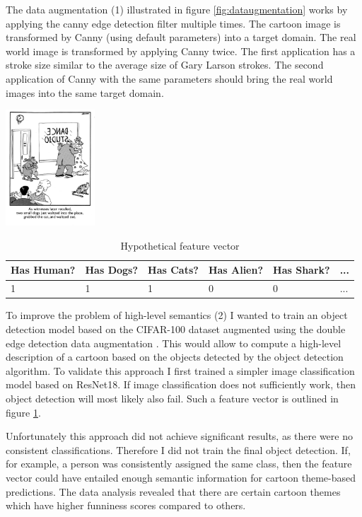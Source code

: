 \documentclass[draft,final,oneside]{vutinfth} %
\begin{document}
The data augmentation (1) illustrated in figure \ref{fig:dataugmentation} works by applying the canny edge detection filter multiple times. The cartoon image is transformed by Canny (using default parameters) into a target domain. The real world image is transformed by applying Canny twice. The first application has a stroke size similar to the average size of Gary Larson strokes. The second application of Canny with the same parameters should bring the real world images into the same target domain.

\begin{table}[]
\centering
\includegraphics[width=0.25\textwidth]{graphics/example_cartoon.png}
\begin{tabular}{|l|l|l|l|l|l|}
\hline
Has Human? & Has Dogs? & Has Cats? & Has Alien? & Has Shark? & ... \\ \hline
1   & 1 & 1 & 0 & 0 & ... \\
\hline
\end{tabular}
\caption{Hypothetical feature vector}
\label{objectdetectionfeaturevector}
\end{table}

To improve the problem of high-level semantics (2) I wanted to train an object detection model based on the CIFAR-100 dataset augmented using the double edge detection data augmentation \cite{cifar100}. This would allow to compute a high-level description of a cartoon based on the objects detected by the object detection algorithm. To validate this approach I first trained a simpler image classification model based on ResNet18. If image classification does not sufficiently work, then object detection will most likely also fail. Such a feature vector is outlined in figure \ref{objectdetectionfeaturevector}.

Unfortunately this approach did not achieve significant results, as there were no consistent classifications. Therefore I did not train the final object detection. If, for example, a person was consistently assigned the same class, then the feature vector could have entailed enough semantic information for cartoon theme-based predictions. The data analysis revealed that there are certain cartoon themes which have higher funniness scores compared to others. 
\end{document}
